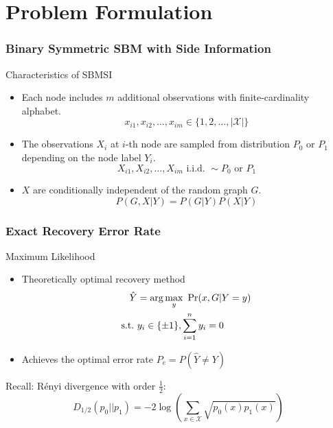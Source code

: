 \documentclass{beamer}
\begin{document}
\section{Problem Formulation}
\begin{frame}
\frametitle{Binary Symmetric SBM with Side Information}
\begin{block}{Characteristics of SBMSI}
\begin{itemize}
	\item   Each node includes $m$ additional observations with
	finite-cardinality alphabet.
	\begin{equation*}
		x_{i1}, x_{i2}, \dots, x_{im} \in \{1, 2, \dots, |\mathcal{X}|\}
	\end{equation*}
	\item The observations $X_i$ at $i$-th node are sampled from distribution $P_0$
	or $P_1$ depending on the node label $Y_i$.
	\begin{equation*}
		X_{i1}, X_{i2}, \dots, X_{im} \textrm{ i.i.d. } \sim P_0 \textrm{ or } P_1
	\end{equation*}
	\item $X$ are conditionally independent of the random
	graph $G$.
	\begin{equation*}
		P(G, X | Y) = P(G | Y) P(X | Y)
	\end{equation*}
\end{itemize}
\end{block}

\end{frame}
\begin{frame}\frametitle{Exact Recovery Error Rate}
\begin{block}{Maximum Likelihood}
\begin{itemize}
	\item Theoretically optimal recovery method
	\begin{align*}
		\hat{Y} &= \arg\max_y\ \Pr(x,G|Y=y) \notag \\
		\textrm{s.t.} \ & y_i \in \{\pm 1\}, \sum_{i=1}^n y_i=0 \label{eq:mle}
	\end{align*}
	\item Achieves the optimal error rate $P_e=P(\hat{Y} \neq Y)$
\end{itemize}
\end{block}
Recall: Rényi divergence with order $\frac{1}{2}$:
\begin{equation*}
	D_{1/2}(p_0 || p_1) = -2\log(\sum_{x \in \mathcal{X}} \sqrt{p_0(x)p_1(x)} )
\end{equation*}
\end{frame}
\end{document}
